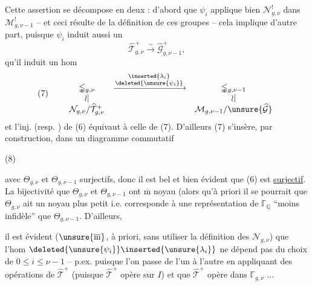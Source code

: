Cette assertion se décompose en deux :  d'abord que $\psi_i$ applique bien $\mathcal N_{g,\nu}^{!}$ dans $\mathcal M_{g,\nu-1}^{!}$ -- et ceci résulte de la définition  de ces groupes -- cela implique d'autre part, puisque $\psi_i$ induit aussi un  
\[
\widehat{\mathcal T}_{g,\nu}^{+}
\xrightarrow{\sim}
\widehat{\mathcal G}_{g,\nu-1}^{+},
\]
qu'il induit un hom
\[
(7)\qquad
\begin{array}{ccc}
\mathbb{\Gamma}_{g,\nu}
&\xrightarrow{\substack{\inserted{\lambda_i}\\\deleted{\unsure{\psi_i}}}}&
\mathbb{\Gamma}_{g,\nu-1}\\
\wr\vert&&\wr\vert\\
\mathcal N_{g,\nu}/\widehat{\mathcal T}_{g,\nu}^{+}
&&\mathcal M_{g,\nu-1}/\unsure{\widehat{\mathcal G}}
\end{array}
\]
et l'inj. (resp. ) de (6) équivaut à celle de (7). D'ailleurs (7) s'insère, par construction, dans un diagramme commutatif

(8)\quad{}

avec $\Theta_{g,\nu}$ et $\Theta_{g,\nu-1}$ surjectifs, donc il est bel et bien évident que (6) est \uline{surjectif}. La bijectivité  que $\Theta_{g,\nu}$ et $\Theta_{g,\nu-1}$ ont $\overline{\mathrm m}$ noyau (alors qu'à priori il se pourrait que $\Theta_{g,\nu}$ ait un noyau plus petit i.e. corresponde à une représentation de $\mathbb{\Gamma}_{\mathbb Q}$ ``moins infidèle'' que $\Theta_{g,\nu-1}$. D'ailleurs,


il est évident  ($\unsure{\overline{\mathrm m}}$, à priori, sans utiliser la définition   des $\mathcal N_{g,\nu}$) que l'hom $\deleted{\unsure{\psi_i}}\inserted{\unsure{\lambda_i}}$  ne dépend pas du choix de $0\leq i\leq\nu-1$ -- p.ex. puisque l'on passe de l'un à l'autre en appliquant des opérations de $\widehat{\mathcal T}^{+}$ (puisque $\widehat{\mathcal T}^{+}$ opère  sur $I$) et que $\widehat{\mathcal T}^{+}$ opère  dans $\mathbb{\Gamma}_{g,\nu}$ ...

